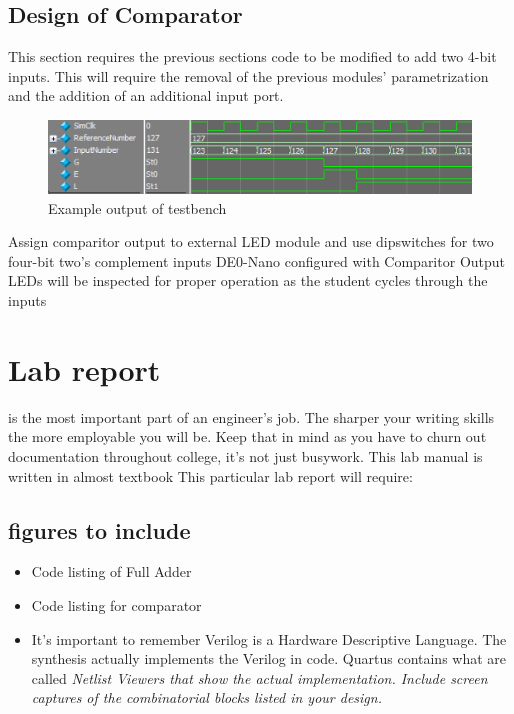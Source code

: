   \subsection{Design of Comparator}
    This section requires the previous sections code to be modified to add two 4-bit inputs. This will require the removal of the previous modules' parametrization and the addition of an additional input port. 
    \begin{figure}[H]
      \label{TestbenchOutput}
      \includegraphics[width=.48\textwidth]{Images/ComparitorTestbench.png}
      \caption{Example output of testbench}
    \end{figure}

      {Assign comparitor output to external LED module and use dipswitches for two four-bit two's complement inputs}
      {DE0-Nano configured with Comparitor}
      {Output LEDs will be inspected for proper operation as the student cycles through the inputs}

  \section{Lab report}
     is the most important part of an engineer's job. The sharper your writing skills the more employable you will be. Keep that in mind as you have to churn out documentation throughout college, it's not just busywork. This lab manual is written in almost textbook This particular lab report will require:
    \subsection{figures to include}
    \begin{itemize}
      \item Code listing of Full Adder
      \item Code listing for comparator
      \item It's important to remember Verilog is a Hardware Descriptive Language. The synthesis actually implements the Verilog in code. Quartus contains what are called \it{Netlist Viewers} that show the actual implementation. Include screen captures of the combinatorial blocks listed in your design.
    \end{itemize}

